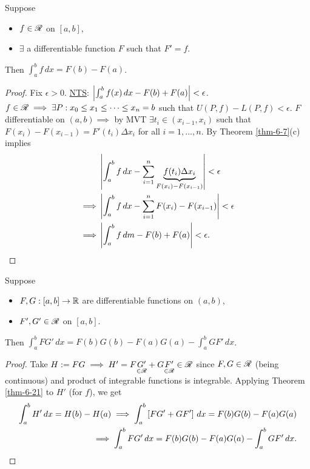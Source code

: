 \documentclass[]{article}
\begin{document}
\begin{theorem}
	\label{thm-6-21}
	Suppose
	\begin{itemize}
		\item $f\in\ms R$ on $[a,b]$,
		\item $\exists$ a differentiable function $F$ such that $F'=f$.
	\end{itemize}
	Then $\int_a^bf\,dx=F(b)-F(a)$.
\end{theorem}
\begin{proof}
	Fix $\epsilon>0$. \ul{NTS}: $\mlr{\int_a^b f(x)\,dx-F(b)+F(a)}<\epsilon$.
	$f\in\ms R\implies \exists P: x_0\leq x_1\leq\dots\leq x_n = b$ such that $U(P,f)-L(P,f)<\epsilon$.
	$F$ differentiable on $(a,b) \implies$ by MVT $\exists t_i\in(x_{i-1},x_i)$ such that $F(x_i)-F(x_{i-1}) = F'(t_i)\Delta x_i$ for all $i=1,\dots,n$.
	By Theorem \ref{thm-6-7}(c) implies 
	\begin{align*}
		& \mlr{\int_a^bf\,dx - \sum_{i=1}^n \ub{F(x_i)-F(x_{i-1})}{f(t_i)\Delta x_i} } < \epsilon \\
		\implies & \mlr{\int_a^b f\,dx - \sum_{i=1}^n F(x_i)-F(x_{i-1})} < \epsilon \\
		\implies & \mlr{\int_a^b f\,dm - F(b)+F(a)} < \epsilon.
	\end{align*}
\end{proof}

\begin{theorem}
	\label{thm-6-22}
	Suppose
	\begin{itemize}
		\item $F,G:[a,b]\ra\mb R$ are differentiable functions on $(a,b)$,
		\item $F',G'\in\ms R$ on $[a,b]$.
	\end{itemize}
	Then $\int_a^b FG'\,dx = F(b)G(b) - F(a)G(a) - \int_a^b GF'\,dx$.
\end{theorem}
\begin{proof}
	Take $H:= FG \implies H' = F\us{\in\ms R}{G'} + G\us{\in\ms R}{F'}\in\ms R$ since $F,G\in\ms R$ (being continuous) and product of integrable functions is integrable.
	Applying Theorem \ref{thm-6-21} to $H'$ (for $f$), we get
	\begin{align*}
		\int_a^bH'\,dx = H(b)-H(a)
		\implies \int_a^b \blr{FG'+GF'}\,dx = F(b)G(b)-F(a)G(a) \\
		\implies \int_a^b FG'\,dx = F(b)G(b)-F(a)G(a) - \int_a^b GF'\,dx.
	\end{align*}
\end{proof}
\end{document}
